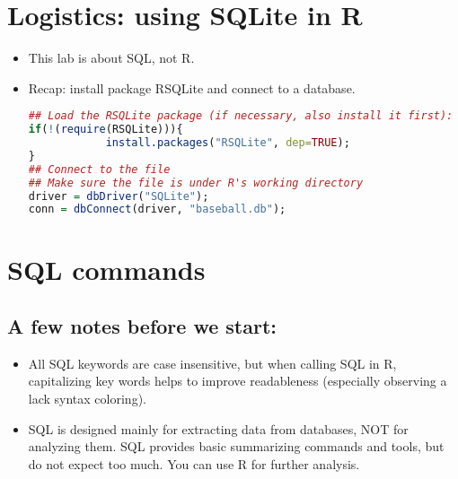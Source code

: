 \documentclass[12pt]{article}
\begin{document}
\section{Logistics: using SQLite in R}
\begin{itemize}
	\item This lab is about SQL, not R.
	\item Recap: install package RSQLite and connect to a database.
\begin{lstlisting}[style=displaycode, language=R]
## Load the RSQLite package (if necessary, also install it first):
if(!(require(RSQLite))){
			install.packages("RSQLite", dep=TRUE);
}
## Connect to the file
## Make sure the file is under R's working directory
driver = dbDriver("SQLite");
conn = dbConnect(driver, "baseball.db");
\end{lstlisting}
	
\end{itemize}


\section{SQL commands}

\subsection{A few notes before we start:}
\begin{itemize}
	\item All SQL keywords are case insensitive, but when calling SQL in R, capitalizing key words helps to improve readableness (especially observing a lack syntax coloring).
	\item SQL is designed mainly for extracting data from databases, NOT for analyzing them. SQL provides basic summarizing commands and tools, but do not expect too much. You can use R for further analysis.
\end{itemize}
\end{document}
